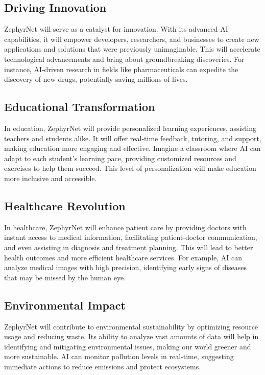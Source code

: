 \documentclass{article}
\begin{document}
	\subsection{Driving Innovation}
	ZephyrNet will serve as a catalyst for innovation. With its advanced AI capabilities, it will empower developers, researchers, and businesses to create new applications and solutions that were previously unimaginable. This will accelerate technological advancements and bring about groundbreaking discoveries. For instance, AI-driven research in fields like pharmaceuticals can expedite the discovery of new drugs, potentially saving millions of lives.
	
	\subsection{Educational Transformation}
	In education, ZephyrNet will provide personalized learning experiences, assisting teachers and students alike. It will offer real-time feedback, tutoring, and support, making education more engaging and effective. Imagine a classroom where AI can adapt to each student's learning pace, providing customized resources and exercises to help them succeed. This level of personalization will make education more inclusive and accessible.
	
	\subsection{Healthcare Revolution}
	In healthcare, ZephyrNet will enhance patient care by providing doctors with instant access to medical information, facilitating patient-doctor communication, and even assisting in diagnosis and treatment planning. This will lead to better health outcomes and more efficient healthcare services. For example, AI can analyze medical images with high precision, identifying early signs of diseases that may be missed by the human eye.
	
	\subsection{Environmental Impact}
	ZephyrNet will contribute to environmental sustainability by optimizing resource usage and reducing waste. Its ability to analyze vast amounts of data will help in identifying and mitigating environmental issues, making our world greener and more sustainable. AI can monitor pollution levels in real-time, suggesting immediate actions to reduce emissions and protect ecosystems.
	
\end{document}
